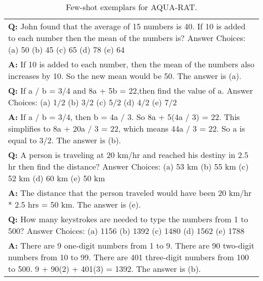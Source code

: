 \begin{table}[h]
    \caption{
    Few-shot exemplars for AQUA-RAT.
    }
    \centering
    \small
    \begin{tabular}{p{13.5cm}}
        \toprule
        \textbf{Q:} John found that the average of 15 numbers is 40. If 10 is added to each number then the mean of the numbers is? Answer Choices: (a) 50 (b) 45 (c) 65 (d) 78 (e) 64\\
        \vspace{-1mm}
        \textbf{A:} If 10 is added to each number, then the mean of the numbers also increases by 10. So the new mean would be 50. The answer is (a). \\
        \vspace{0mm}
        \textbf{Q:} If a / b = 3/4 and 8a + 5b = 22,then find the value of a. Answer Choices: (a) 1/2 (b) 3/2 (c) 5/2 (d) 4/2 (e) 7/2\\
        \vspace{-1mm}
        \textbf{A:} If a / b = 3/4, then b = 4a / 3. So 8a + 5(4a / 3) = 22. This simplifies to 8a + 20a / 3 = 22, which means 44a / 3 = 22. So a is equal to 3/2. The answer is (b).\\
        \vspace{0mm}
        \textbf{Q:} A person is traveling at 20 km/hr and reached his destiny in 2.5 hr then find the distance? Answer Choices: (a) 53 km (b) 55 km (c) 52 km (d) 60 km (e) 50 km\\
        \vspace{-1mm}
        \textbf{A:} The distance that the person traveled would have been 20 km/hr * 2.5 hrs = 50 km. The answer is (e).\\
        \vspace{0mm}
        \textbf{Q:} How many keystrokes are needed to type the numbers from 1 to 500? Answer Choices: (a) 1156 (b) 1392 (c) 1480 (d) 1562 (e) 1788\\
        \vspace{-1mm}
        \textbf{A:} There are 9 one-digit numbers from 1 to 9. There are 90 two-digit numbers from 10 to 99. There are 401 three-digit numbers from 100 to 500. 9 + 90(2) + 401(3) = 1392. The answer is (b).\\
        \bottomrule
    \end{tabular}
    \label{tab:prompt-aqua}
\end{table}

